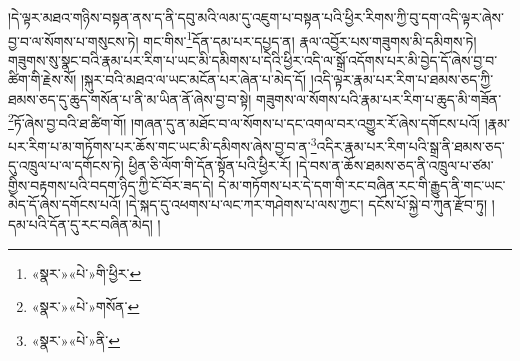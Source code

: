།དེ་ལྟར་མཐའ་གཉིས་བསྟན་ནས་ད་ནི་དབུ་མའི་ལམ་དུ་འཇུག་པ་བསྟན་པའི་ཕྱིར་རིགས་ཀྱི་བུ་དག་འདི་ལྟར་ཞེས་བྱ་བ་ལ་སོགས་པ་གསུངས་ཏེ། གང་གིས་\footnote{«སྣར་»«པེ་»གི་ཕྱིར་}དོན་དམ་པར་དཔྱད་ན། རྣལ་འབྱོར་པས་གཟུགས་མི་དམིགས་ཏེ། གཟུགས་སུ་སྣང་བའི་རྣམ་པར་རིག་པ་ཡང་མི་དམིགས་པ་དེའི་ཕྱིར་འདི་ལ་སྒྲོ་འདོགས་པར་མི་བྱེད་དོ་ཞེས་བྱ་བ་ཚིག་གི་རྗེས་སོ། །སྐུར་བའི་མཐའ་ལ་ཡང་མངོན་པར་ཞེན་པ་མེད་དོ། །འདི་ལྟར་རྣམ་པར་རིག་པ་ཐམས་ཅད་ཀྱི་ཐམས་ཅད་དུ་ཆུད་གསོན་པ་ནི་མ་ཡིན་ནོ་ཞེས་བྱ་བ་སྟེ། གཟུགས་ལ་སོགས་པའི་རྣམ་པར་རིག་པ་ཆུད་མི་གཟོན་\footnote{«སྣར་»«པེ་»གསོན་}ཏོ་ཞེས་བྱ་བའི་ཐ་ཚིག་གོ། །གཞན་དུ་ན་མཐོང་བ་ལ་སོགས་པ་དང་འགལ་བར་འགྱུར་རོ་ཞེས་དགོངས་པའོ། །རྣམ་པར་རིག་པ་མ་གཏོགས་པར་ཆོས་གང་ཡང་མི་དམིགས་ཞེས་བྱ་བ་ན་\footnote{«སྣར་»«པེ་»ནི་}འདིར་རྣམ་པར་རིག་པའི་སྒྲ་ནི་ཐམས་ཅད་དུ་འཁྲུལ་པ་ལ་དགོངས་ཏེ། ཕྱིན་ཅི་ལོག་གི་དོན་སྟོན་པའི་ཕྱིར་རོ། །དེ་བས་ན་ཆོས་ཐམས་ཅད་ནི་འཁྲུལ་པ་ཙམ་གྱིས་བརྟགས་པའི་བདག་ཉིད་ཀྱི་ངོ་བོར་ཟད་དེ། དེ་མ་གཏོགས་པར་དེ་དག་གི་རང་བཞིན་རང་གི་རྒྱུད་ནི་གང་ཡང་མེད་དོ་ཞེས་དགོངས་པའོ། །དེ་སྐད་དུ་འཕགས་པ་ལང་ཀར་གཤེགས་པ་ལས་ཀྱང་། དངོས་པོ་སྐྱེ་བ་ཀུན་རྫོབ་ཏུ། །དམ་པའི་དོན་དུ་རང་བཞིན་མེད། །
